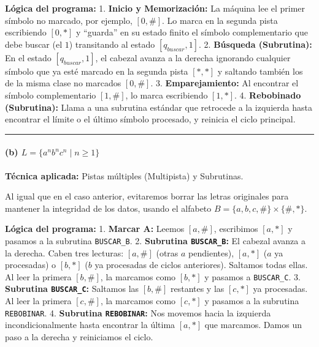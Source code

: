 \documentclass[12pt]{book} %
\begin{document}
\textbf{Lógica del programa:} 1. \textbf{Inicio y Memorización:} La
máquina lee el primer símbolo no marcado, por ejemplo, \([0, \#]\). Lo
marca en la segunda pista escribiendo \([0, *]\) y ``guarda'' en su
estado finito el símbolo complementario que debe buscar (el \(1\))
transitando al estado \([q_{buscar}, 1]\). 2. \textbf{Búsqueda
(Subrutina):} En el estado \([q_{buscar}, 1]\), el cabezal avanza a la
derecha ignorando cualquier símbolo que ya esté marcado en la segunda
pista \([*, *]\) y saltando también los de la misma clase no marcados
\([0, \#]\). 3. \textbf{Emparejamiento:} Al encontrar el símbolo
complementario \([1, \#]\), lo marca escribiendo \([1, *]\). 4.
\textbf{Rebobinado (Subrutina):} Llama a una subrutina estándar que
retrocede a la izquierda hasta encontrar el límite o el último símbolo
procesado, y reinicia el ciclo principal.

\begin{center}\rule{0.5\linewidth}{0.5pt}\end{center}

\hypertarget{b-l-an-bn-cn-mid-n-ge-1-1}{%
\paragraph{\texorpdfstring{(b)
\(L = \{a^n b^n c^n \mid n \ge 1\}\)}{(b) L = \textbackslash\{a\^{}n b\^{}n c\^{}n \textbackslash mid n \textbackslash ge 1\textbackslash\}}}\label{b-l-an-bn-cn-mid-n-ge-1-1}}

\textbf{Técnica aplicada:} Pistas múltiples (Multipista) y Subrutinas.

Al igual que en el caso anterior, evitaremos borrar las letras
originales para mantener la integridad de los datos, usando el alfabeto
\(B = \{a, b, c, \#\} \times \{\#, *\}\).

\textbf{Lógica del programa:} 1. \textbf{Marcar A:} Leemos \([a, \#]\),
escribimos \([a, *]\) y pasamos a la subrutina \texttt{BUSCAR\_B}. 2.
\textbf{Subrutina \texttt{BUSCAR\_B}:} El cabezal avanza a la derecha.
Caben tres lecturas: \([a, \#]\) (otras \(a\) pendientes), \([a, *]\)
(\(a\) ya procesadas) o \([b, *]\) (\(b\) ya procesadas de ciclos
anteriores). Saltamos todas ellas. Al leer la primera \([b, \#]\), la
marcamos como \([b, *]\) y pasamos a \texttt{BUSCAR\_C}. 3.
\textbf{Subrutina \texttt{BUSCAR\_C}:} Saltamos las \([b, \#]\)
restantes y las \([c, *]\) ya procesadas. Al leer la primera
\([c, \#]\), la marcamos como \([c, *]\) y pasamos a la subrutina
\texttt{REBOBINAR}. 4. \textbf{Subrutina \texttt{REBOBINAR}:} Nos
movemos hacia la izquierda incondicionalmente hasta encontrar la última
\([a, *]\) que marcamos. Damos un paso a la derecha y reiniciamos el
ciclo.
\end{document}
